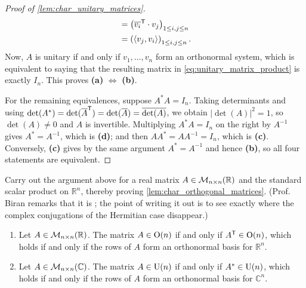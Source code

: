 \begin{proof}[Proof of \cref{lem:char_unitary_matrices}]
\begin{align}
    &= \left( \overline{v_i}^{\mathsf{T}} \cdot v_j \right)_{1 \leq i, j \leq n} \nonumber \\
    \label{eq:unitary_matrix_product}
    &= \left( \langle v_j, v_i \rangle \right)_{1 \leq i, j \leq n}.
\end{align}
Now, $A$ is unitary if and only if $v_1, \dots, v_n$ form an orthonormal system, which is equivalent to saying that the resulting matrix in \eqref{eq:unitary_matrix_product} is exactly $I_n$. This proves \textbf{(a)} $\iff$ \textbf{(b)}.

For the remaining equivalences, suppose $A^* A = I_n$. Taking determinants and using $\det(A^*) = \det(\overline{A}^{\mathsf{T}}) = \det(\overline{A}) = \overline{\det(A)}$, we obtain $\left| \det(A) \right|^2 = 1$, so $\det(A) \ne 0$ and $A$ is invertible. Multiplying $A^* A = I_n$ on the right by $A^{-1}$ gives $A^* = A^{-1}$, which is \textbf{(d)}; and then $A A^* = A A^{-1} = I_n$, which is \textbf{(c)}. Conversely, \textbf{(c)} gives by the same argument $A^* = A^{-1}$ and hence \textbf{(b)}, so all four statements are equivalent.
\end{proof}

\begin{exercise}
\label{exc:char_orthogonal_matrices_proof}
Carry out the argument above for a real matrix $A \in \mathcal{M}_{n \times n}(\mathbb{R})$ and the standard scalar product on $\mathbb{R}^n$, thereby proving \cref{lem:char_orthogonal_matrices}. (Prof. Biran remarks that it is ; the point of writing it out is to see exactly where the complex conjugations of the Hermitian case disappear.)
\end{exercise}

\begin{corollary}
\label{cor:rows_orthogonal_unitary}
\begin{enumerate}[label=\textbf{(\alph*)}]
    \item Let $A \in \mathcal{M}_{n \times n}(\mathbb{R})$. The matrix $A \in \operatorname{O}(n)$ if and only if $A^{\mathsf{T}} \in \operatorname{O}(n)$, which holds if and only if the rows of $A$ form an orthonormal basis for $\mathbb{R}^n$.
    \item Let $A \in \mathcal{M}_{n \times n}(\mathbb{C})$. The matrix $A \in \operatorname{U}(n)$ if and only if $A^* \in \operatorname{U}(n)$, which holds if and only if the rows of $A$ form an orthonormal basis for $\mathbb{C}^n$.
\end{enumerate}
\end{corollary}

